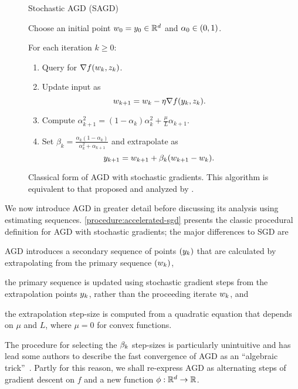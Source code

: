 \begin{figure}[t]
    \centering
    \begin{procedure}{Stochastic \ac{AGD} (\ac{SAGD})}
    \item Choose an initial point \( w_0 = y_0 \in \mathbb{R}^d \) and \( \alpha_0 \in \left(0,1\right) \).
        \item For each iteration \( k \geq 0 \):
            \begin{enumerate}
                \item Query \oracle{} for \( \nabla f(w_k, z_{k}) \). 
                \item Update input as\vspace{-1ex}%
                \[ w_{k+1} = w_k - \eta \nabla f(y_k, z_{k}). \]
                \item Compute 
                    \( \alpha_{k+1}^2 = (1 - \alpha_k)\alpha_k^2 + \frac{\mu}{L} \alpha_{k+1} \).
                \item Set \( \beta_{k} = \frac{\alpha_k (1-\alpha_k)}{\alpha_k^2 + \alpha_{k+1}} \) and extrapolate as
                    \[ y_{k+1} = w_{k+1} + \beta_k (w_{k+1} - w_k).  \] 
            \end{enumerate}
    \end{procedure}
    \caption[Classic procedural definition of Nesterov's accelerated gradient descent algorithm.]%
            {Classical form of \ac{AGD} with stochastic gradients. 
            This algorithm is equivalent to that proposed and analyzed by \citet{vaswani2019fast}.}%
    \label{procedure:accelerated-sgd}
\end{figure} 

We now introduce \ac{AGD} in greater detail before discussing its analysis using estimating sequences. 
\autoref{procedure:accelerated-sgd} presents the classic procedural definition for \ac{AGD} with stochastic gradients; the major differences to \ac{SGD} are
\begin{inparaenum}[(i)]
\item \ac{AGD} introduces a secondary sequence of points \( \left(y_k\right) \) that are calculated by extrapolating from the primary sequence \( \left(w_k\right) \),
\item the primary sequence is updated using stochastic gradient steps from the extrapolation points \( y_k \), rather than the proceeding iterate \( w_k \), and 
\item the extrapolation step-size is computed from a quadratic equation that depends on \( \mu \) and \( L \), where \( \mu = 0 \) for convex functions. 
\end{inparaenum}
The procedure for selecting the \( \beta_{k} \) step-sizes is particularly unintuitive and has lead some authors to describe the fast convergence of \ac{AGD} as an ``algebraic trick''~\citep{allen2014linear}.
Partly for this reason, we shall re-express \ac{AGD} as alternating steps of gradient descent on \( f \) and a new function \( \phi : \mathbb{R}^d \rightarrow \mathbb{R} \).


